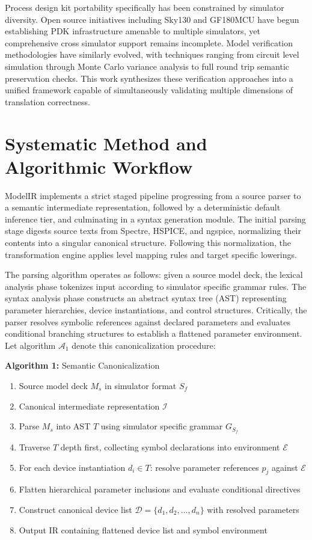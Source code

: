\documentclass[10pt,twocolumn]{article}
\begin{document}
Process design kit portability specifically has been constrained by simulator diversity. Open source initiatives including Sky130 \cite{r16} and GF180MCU \cite{r17} have begun establishing PDK infrastructure amenable to multiple simulators, yet comprehensive cross simulator support remains incomplete. Model verification methodologies have similarly evolved, with techniques ranging from circuit level simulation through Monte Carlo variance analysis to full round trip semantic preservation checks. This work synthesizes these verification approaches into a unified framework capable of simultaneously validating multiple dimensions of translation correctness.

\section{Systematic Method and Algorithmic Workflow}
ModelIR implements a strict staged pipeline progressing from a source parser to a semantic intermediate representation, followed by a deterministic default inference tier, and culminating in a syntax generation module. The initial parsing stage digests source texts from Spectre, HSPICE, and ngspice, normalizing their contents into a singular canonical structure. Following this normalization, the transformation engine applies level mapping rules and target specific lowerings. 

The parsing algorithm operates as follows: given a source model deck, the lexical analysis phase tokenizes input according to simulator specific grammar rules. The syntax analysis phase constructs an abstract syntax tree (AST) representing parameter hierarchies, device instantiations, and control structures. Critically, the parser resolves symbolic references against declared parameters and evaluates conditional branching structures to establish a flattened parameter environment. Let algorithm $\mathcal{A}_1$ denote this canonicalization procedure:

\smallskip
\noindent \textbf{Algorithm 1:} Semantic Canonicalization
\begin{enumerate}
\item[\textbf{Input:}] Source model deck $M_s$ in simulator format $S_f$
\item[\textbf{Output:}] Canonical intermediate representation $\mathcal{I}$
\item Parse $M_s$ into AST $T$ using simulator specific grammar $G_{S_f}$
\item Traverse $T$ depth first, collecting symbol declarations into environment $\mathcal{E}$
\item For each device instantiation $d_i \in T$: resolve parameter references $p_j$ against $\mathcal{E}$
\item Flatten hierarchical parameter inclusions and evaluate conditional directives
\item Construct canonical device list $\mathcal{D} = \{d_1, d_2, \ldots, d_n\}$ with resolved parameters
\item Output IR containing flattened device list and symbol environment
\end{enumerate}
\end{document}
